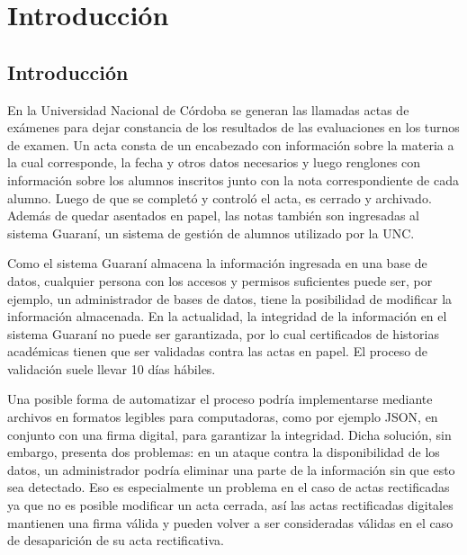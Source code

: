 
\chapter{Introducción} %

\label{Chapter1} %


\section{Introducción}

En la Universidad Nacional de Córdoba se generan las llamadas actas de exámenes para dejar constancia de los resultados de las evaluaciones en los turnos de examen. Un acta consta de un encabezado con información sobre la materia a la cual corresponde, la fecha y otros datos necesarios y luego renglones con información sobre los alumnos inscritos junto con la nota correspondiente de cada alumno.
Luego de que se completó y controló el acta, es cerrado y archivado. Además de quedar asentados en papel, las notas también son ingresadas al sistema Guaraní, un sistema de gestión de alumnos utilizado por la UNC.

Como el sistema Guaraní almacena la información ingresada en una base de datos, cualquier persona con los accesos y permisos suficientes puede ser, por ejemplo, un administrador de bases de datos, tiene la posibilidad de modificar la información almacenada. En la actualidad, la integridad de la información en el sistema Guaraní no puede ser garantizada, por lo cual certificados de historias académicas tienen que ser validadas contra las actas en papel. El proceso de validación suele llevar 10 días hábiles.

Una posible forma de automatizar el proceso podría implementarse mediante archivos en formatos legibles para computadoras, como por ejemplo JSON, en conjunto con una firma digital, para garantizar la integridad. Dicha solución, sin embargo, presenta dos problemas: en un ataque contra la disponibilidad de los datos, un administrador podría eliminar una parte de la información sin que esto sea detectado. Eso es especialmente un problema en el caso de actas rectificadas ya que no es posible modificar un acta cerrada, así las actas rectificadas digitales mantienen una firma válida y pueden volver a ser consideradas válidas en el caso de desaparición de su acta rectificativa.


